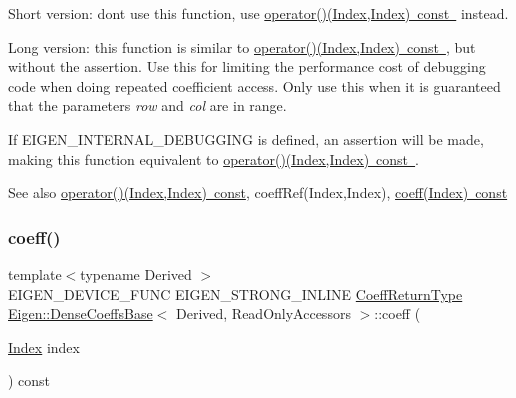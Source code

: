 Short version\+: don\textquotesingle{}t use this function, use \mbox{\hyperlink{class_eigen_1_1_dense_coeffs_base_3_01_derived_00_01_read_only_accessors_01_4_a29ac34389e098ec963ebb2ebd351335a}{operator()(\+Index,\+Index) const }} instead.

Long version\+: this function is similar to \mbox{\hyperlink{class_eigen_1_1_dense_coeffs_base_3_01_derived_00_01_read_only_accessors_01_4_a29ac34389e098ec963ebb2ebd351335a}{operator()(\+Index,\+Index) const }}, but without the assertion. Use this for limiting the performance cost of debugging code when doing repeated coefficient access. Only use this when it is guaranteed that the parameters {\itshape row} and {\itshape col} are in range.

If E\+I\+G\+E\+N\+\_\+\+I\+N\+T\+E\+R\+N\+A\+L\+\_\+\+D\+E\+B\+U\+G\+G\+I\+NG is defined, an assertion will be made, making this function equivalent to \mbox{\hyperlink{class_eigen_1_1_dense_coeffs_base_3_01_derived_00_01_read_only_accessors_01_4_a29ac34389e098ec963ebb2ebd351335a}{operator()(\+Index,\+Index) const }}.

\begin{DoxySeeAlso}{See also}
\mbox{\hyperlink{class_eigen_1_1_dense_coeffs_base_3_01_derived_00_01_read_only_accessors_01_4_a29ac34389e098ec963ebb2ebd351335a}{operator()(\+Index,\+Index) const}}, coeff\+Ref(\+Index,\+Index), \mbox{\hyperlink{class_eigen_1_1_dense_coeffs_base_3_01_derived_00_01_read_only_accessors_01_4_ad52344ad1f42852db71996590d2de0de}{coeff(\+Index) const}} 
\end{DoxySeeAlso}
\mbox{\label{class_eigen_1_1_dense_coeffs_base_3_01_derived_00_01_read_only_accessors_01_4_ad52344ad1f42852db71996590d2de0de}} 
\subsubsection{\texorpdfstring{coeff()}{coeff()}\hspace{0.1cm}{\footnotesize\ttfamily [2/2]}}
{\footnotesize\ttfamily template$<$typename Derived $>$ \\
E\+I\+G\+E\+N\+\_\+\+D\+E\+V\+I\+C\+E\+\_\+\+F\+U\+NC E\+I\+G\+E\+N\+\_\+\+S\+T\+R\+O\+N\+G\+\_\+\+I\+N\+L\+I\+NE \mbox{\hyperlink{struct_eigen_1_1internal_1_1true__type}{Coeff\+Return\+Type}} \mbox{\hyperlink{class_eigen_1_1_dense_coeffs_base}{Eigen\+::\+Dense\+Coeffs\+Base}}$<$ Derived, Read\+Only\+Accessors $>$\+::coeff (\begin{DoxyParamCaption}\item[{\mbox{\hyperlink{struct_eigen_1_1_eigen_base_a554f30542cc2316add4b1ea0a492ff02}{Index}}}]{index }\end{DoxyParamCaption}) const\hspace{0.3cm}{\ttfamily [inline]}}

